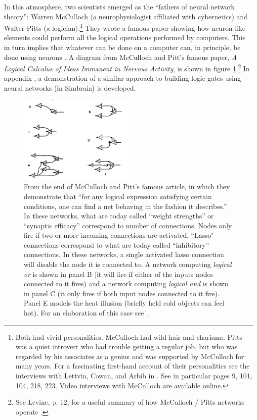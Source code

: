 In this atmosphere, two scientists emerged as the ``fathers of neural network theory'': Warren McCulloch (a neurophysiologist affiliated with cybernetics) and Walter Pitts (a logician).\footnote{Both had vivid personalities. McCulloch had wild hair and charisma. Pitts was a quiet introvert who had trouble getting a regular job, but who was regarded by his associates as a genius and was supported by McCulloch for many years. For a fascinating first-hand account of their personalities see the interviews with Lettvin, Cowan, and Arbib in \cite{anderson2000talking}. See in particular pages 9, 101, 104, 218, 223. Video interviews with McCulloch are available online.}  They wrote a famous paper  showing how neuron-like elements could perform all the logical operations performed by computers. This in turn implies that whatever can be done on a computer can, in principle, be done using neurons \cite{mcculloch1943logical}. A diagram from McCulloch and Pitt's famous paper, \emph{A Logical Calculus of Ideas Immanent in Nervous Activity}, is shown in figure \ref{mp}.\footnote{See Levine, p. 12, for a useful summary of how McCulloch / Pitts networks operate \cite{levine2000introduction}.}  In appendix , a demonstration of a similar approach to building logic gates using neural networks (in Simbrain) is developed.

\begin{figure}[h]
\centering
\includegraphics[width=0.5\textwidth]{./images/McCullochPitts.png}
\caption[From \cite{mcculloch1943logical}.]{From the end of McCulloch and Pitt's famous article, in which they demonstrate that ``for any logical expression satisfying certain conditions, one can find a net behaving in the fashion it describes.''  In these networks, what are today called ``weight strengths'' or ``synaptic efficacy'' correspond to number of connections. Nodes only fire if two or more incoming connections are activated. ``Lasso" connections correspond to what are today called ``inhibitory'' connections. In these networks, a single activated lasso connection will disable the node it is connected to. A network computing \emph{logical or} is shown in panel B (it will fire if either of the inputs nodes connected to it fires) and a network computing \emph{logical and} is shown in panel C (it only fires if both input nodes connected to it fire). Panel E models the heat illusion (briefly held cold objects can feel hot). For an elaboration of this case see \cite{piccinini2004first}.}
\label{mp}
\end{figure}

